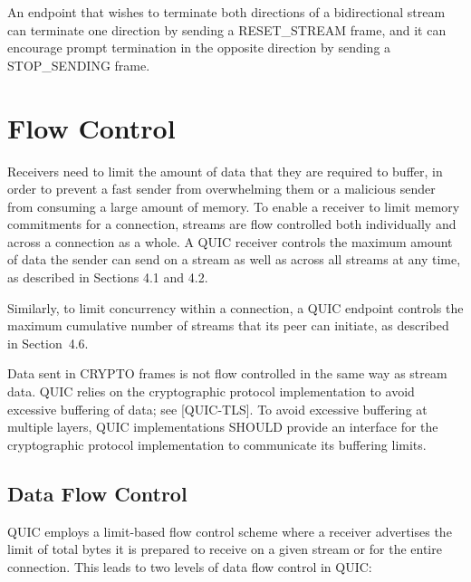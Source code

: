 \documentclass{article}
\begin{document}
An endpoint that wishes to terminate both directions of a bidirectional stream can terminate one direction by sending a RESET\_STREAM frame, and it can encourage prompt termination in the opposite direction by sending a STOP\_SENDING frame.

\section{Flow Control}

Receivers need to limit the amount of data that they are required to buffer, in order to prevent a fast sender from overwhelming them or a malicious sender from consuming a large amount of memory.  To enable a receiver to limit memory commitments for a connection, streams are flow controlled both individually and across a connection as a whole. A QUIC receiver controls the maximum amount of data the sender can send on a stream as well as across all streams at any time, as described in Sections 4.1 and 4.2.

Similarly, to limit concurrency within a connection, a QUIC endpoint controls the maximum cumulative number of streams that its peer can initiate, as described in Section~4.6.

Data sent in CRYPTO frames is not flow controlled in the same way as stream data.  QUIC relies on the cryptographic protocol implementation to avoid excessive buffering of data; see [QUIC-TLS]. To avoid excessive buffering at multiple layers, QUIC implementations SHOULD provide an interface for the cryptographic protocol implementation to communicate its buffering limits.

\subsection{Data Flow Control}

QUIC employs a limit-based flow control scheme where a receiver advertises the limit of total bytes it is prepared to receive on a given stream or for the entire connection.  This leads to two levels of data flow control in QUIC:
\end{document}
